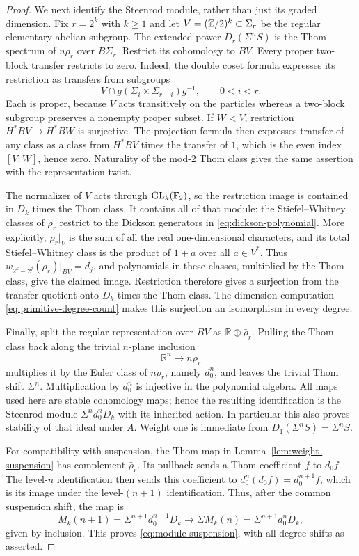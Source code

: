 \begin{proof}
We next identify the Steenrod module, rather than just its graded
dimension. Fix $r=2^k$ with $k\geq1$ and let
$V=(\mathbb Z/2)^k\subset\Sigma_r$ be the regular elementary abelian
subgroup. The extended power $D_r(\Sigma^nS)$ is the Thom spectrum
of $n\rho_r$ over $B\Sigma_r$. Restrict its cohomology to $BV$.
Every proper two-block transfer restricts to zero. Indeed, the double
coset formula expresses its restriction as transfers from subgroups
\[
 V\cap g(\Sigma_i\times\Sigma_{r-i})g^{-1},\qquad 0<i<r.
\]
Each is proper, because $V$ acts transitively on the particles whereas
a two-block subgroup preserves a nonempty proper subset. If $W<V$,
restriction $H^*BV\to H^*BW$ is surjective. The projection formula
then expresses transfer of any class as a class from $H^*BV$ times
the transfer of $1$, which is the even index $[V:W]$, hence zero.
Naturality of the mod-$2$ Thom class gives the same assertion with
the representation twist.

The normalizer of $V$ acts through $\operatorname{GL}_k(\mathbb F_2)$, so the restriction
image is contained in $D_k$ times the Thom class. It contains all
of that module: the Stiefel--Whitney classes of $\rho_r$ restrict to
the Dickson generators in \eqref{eq:dickson-polynomial}. More
explicitly, $\rho_r|_V$ is the sum of all the real one-dimensional
characters, and its total Stiefel--Whitney class is the product of
$1+a$ over all $a\in V^*$. Thus
$w_{2^k-2^j}(\rho_r)|_{BV}=d_j$, and polynomials in these classes,
multiplied by the Thom class, give the claimed image. Restriction
therefore gives a surjection from the transfer quotient onto $D_k$
times the Thom class. The dimension computation
\eqref{eq:primitive-degree-count} makes this surjection an
isomorphism in every degree.

Finally, split the regular representation over $BV$ as
$\mathbb R\oplus\bar\rho_r$. Pulling the Thom class back along
the trivial $n$-plane inclusion
\[
 \mathbb R^n\longrightarrow n\rho_r
\]
multiplies it by the Euler class of $n\bar\rho_r$, namely $d_0^n$,
and leaves the trivial Thom shift $\Sigma^n$. Multiplication by
$d_0^n$ is injective in the polynomial algebra. All maps used here
are stable cohomology maps; hence the resulting identification is
the Steenrod module $\Sigma^nd_0^nD_k$ with its inherited action.
In particular this also proves stability of that ideal under $A$.
Weight one is immediate from $D_1(\Sigma^nS)=\Sigma^nS$.

For compatibility with suspension, the Thom map in
Lemma~\ref{lem:weight-suspension} has complement $\bar\rho_r$.
Its pullback sends a Thom coefficient $f$ to $d_0f$. The level-$n$
identification then sends this coefficient to
$d_0^n(d_0f)=d_0^{n+1}f$, which is its image under the level-$(n+1)$
identification. Thus, after the common suspension shift, the map is
\[
 M_k(n+1)=\Sigma^{n+1}d_0^{n+1}D_k
 \longrightarrow
 \Sigma M_k(n)=\Sigma^{n+1}d_0^nD_k,
\]
given by inclusion. This proves \eqref{eq:module-suspension}, with
all degree shifts as asserted.
\end{proof}

